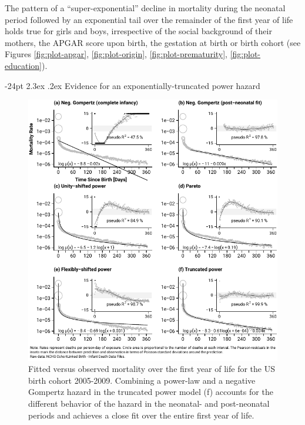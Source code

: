 \documentclass[10pt, twoside, parskip=half]{article}
\makeatletter
\def\maxwidth{\ifdim\Gin@nat@width>\linewidth\linewidth
  \else\Gin@nat@width\fi}
\let\Oldincludegraphics\includegraphics
\renewcommand{\includegraphics}[1]{\Oldincludegraphics[width=\maxwidth]{#1}}
\renewcommand\section{\@startsection {section}{1}{\z@}%
                                   {-24pt}%
                                   {2.3ex \@plus.2ex}%
                                   {\normalfont\large\bfseries}}
\makeatother
\begin{document}
The pattern of a ``super-exponential'' decline in mortality during the
neonatal period followed by an exponential tail over the remainder of
the first year of life holds true for girls and boys, irrespective of
the social background of their mothers, the APGAR score upon birth, the
gestation at birth or birth cohort (see Figures \ref{fig:plot-apgar},
\ref{fig:plot-origin}, \ref{fig:plot-prematurity},
\ref{fig:plot-education}).

\section{Evidence for an exponentially-truncated power
hazard}\label{evidence-for-an-exponentially-truncated-power-hazard}

\begin{figure}
\centering
\includegraphics{fig/figure3.pdf}
\caption{\label{fig:plot-evidence}Fitted versus observed mortality over the
first year of life for the US birth cohort 2005-2009. Combining a
power-law and a negative Gompertz hazard in the truncated power model
(f) accounts for the different behavior of the hazard in the neonatal-
and post-neonatal periods and achieves a close fit over the entire first
year of life.}
\end{figure}
\end{document}
